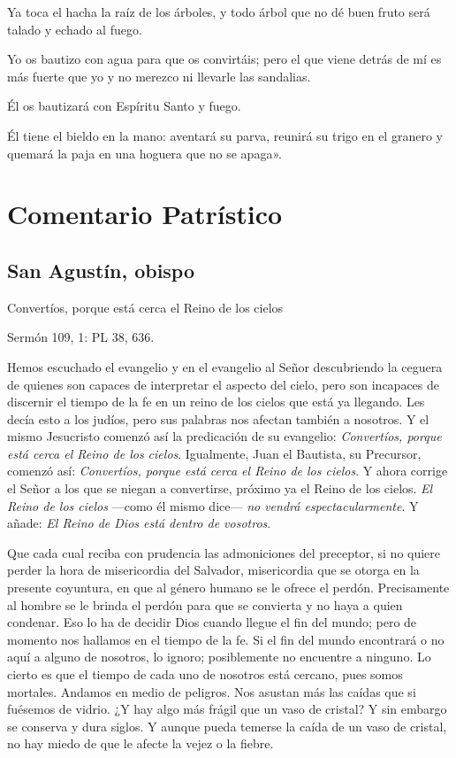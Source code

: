 Ya toca el hacha la raíz de los árboles, y todo árbol que no dé buen
fruto será talado y echado al fuego.

Yo os bautizo con agua para que os convirtáis; pero el que viene detrás
de mí es más fuerte que yo y no merezco ni llevarle las sandalias.

Él os bautizará con Espíritu Santo y fuego.

Él tiene el bieldo en la mano: aventará su parva, reunirá su trigo en el
granero y quemará la paja en una hoguera que no se
apaga».

\section{Comentario Patrístico}



\subsection{San Agustín, obispo}

Convertíos, porque está cerca el Reino de los cielos

Sermón 109, 1: PL 38, 636.

Hemos escuchado el evangelio y en el evangelio al Señor descubriendo la ceguera de quienes son capaces de interpretar el aspecto del cielo, pero son incapaces de discernir el tiempo de la fe en un reino de los cielos que está ya llegando. Les decía esto a los judíos, pero sus palabras nos afectan también a nosotros. Y el mismo Jesucristo comenzó así la predicación de su evangelio: \emph{Convertíos, porque está cerca el Reino de los cielos}. Igualmente, Juan el Bautista, su Precursor, comenzó así: \emph{Convertíos, porque está cerca el Reino de los cielos}. Y ahora corrige el Señor a los que se niegan a convertirse, próximo ya el Reino de los cielos. \emph{El Reino de los cielos} ---como él mismo dice--- \emph{no vendrá espectacularmente}. Y añade: \emph{El Reino de Dios está dentro de vosotros}.

Que cada cual reciba con prudencia las admoniciones del preceptor, si no quiere perder la hora de misericordia del Salvador, misericordia que se otorga en la presente coyuntura, en que al género humano se le ofrece el perdón. Precisamente al hombre se le brinda el perdón para que se convierta y no haya a quien condenar. Eso lo ha de decidir Dios cuando llegue el fin del mundo; pero de momento nos hallamos en el tiempo de la fe. Si el fin del mundo encontrará o no aquí a alguno de nosotros, lo ignoro; posiblemente no encuentre a ninguno. Lo cierto es que el tiempo de cada uno de nosotros está cercano, pues somos mortales. Andamos en medio de peligros. Nos asustan más las caídas que si fuésemos de vidrio. ¿Y hay algo más frágil que un vaso de cristal? Y sin embargo se conserva y dura siglos. Y aunque pueda temerse la caída de un vaso de cristal, no hay miedo de que le afecte la vejez o la fiebre.

